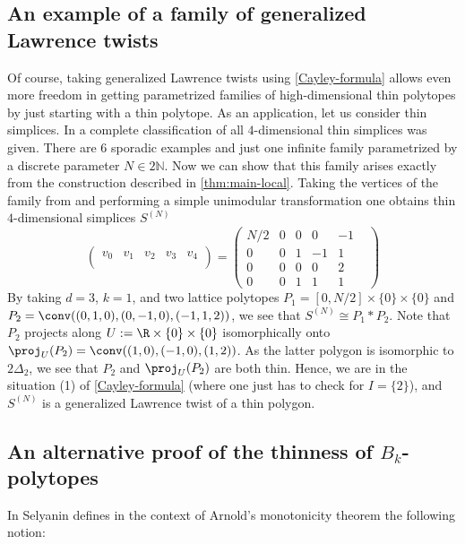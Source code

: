 \documentclass[reqno, 11pt, a4paper, oneside]{amsart}
\begin{document}
\subsection{An example of a family of generalized Lawrence twists}

Of course, taking generalized Lawrence twists using \cref{Cayley-formula} allows even more freedom in getting parametrized families of high-dimensional thin polytopes by just starting with a thin polytope. As an application, let us consider thin simplices. In \cite{kurylenko_thin_2024} a complete classification of all $4$-dimensional thin simplices was given. There are 6 sporadic examples and just one infinite family parametrized by a discrete parameter $N \in 2 \mathbb{N}$. Now we can show that this family arises exactly from the construction described in \cref{thm:main-local}. Taking the vertices of the family from \cite{kurylenko_thin_2024} and performing a simple unimodular transformation one obtains thin $4$-dimensional simplices $S^{(N)}$
\[ \begin{pmatrix}
    v_0 & v_1 & v_2 & v_3 & v_4\\
\end{pmatrix} = \begin{pmatrix}
    N/2 & 0 & 0 & 0 & -1 &  \\
    0 & 0 &  1 & -1 & 1 &  \\
     0 & 0  & 0 & 0 & 2 &\\
    0 & 0 & 1 & 1 & 1 & 
\end{pmatrix}\] 
By taking $d=3$, $k=1$, and two lattice polytopes $P_1 = [0, N/2] \times \{0\} \times \{0\}$ and $P_2 = \conv((0,1,0),(0,-1,0),(-1,1,2))$, we see that $S^{(N)} \cong P_1 * P_2$. Note that $P_2$ projects along $U:= \R \times \{0\} \times \{0\}$ isomorphically onto $\proj_U(P_2) = \conv((1,0),(-1,0),(1,2))$. As the latter polygon is isomorphic to $2 \Delta_2$, we see that $P_2$ and $\proj_U(P_2)$ are both thin.  Hence, we are in the situation (1) of \cref{Cayley-formula} (where one just has to check for $I=\{2\}$), and $S^{(N)}$ is a generalized Lawrence twist of a thin polygon.

\subsection{An alternative proof of the thinness of \texorpdfstring{$B_k$}{Bk}-polytopes}

In \cite{selyanin2025newtonnumbersvanishingpolytopes} Selyanin defines in the context of Arnold's monotonicity theorem the following notion:
\end{document}
